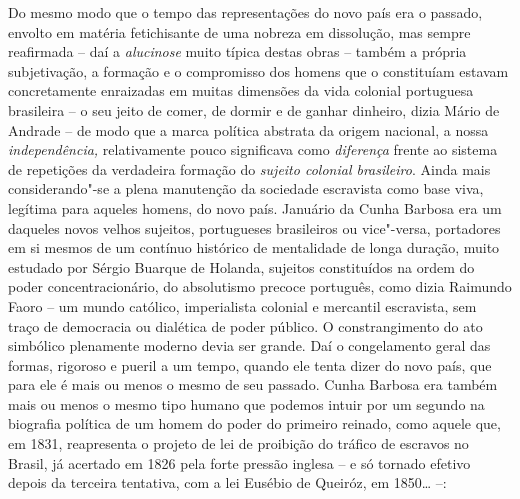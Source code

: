 Do mesmo modo que o tempo das representações do novo país era o passado,
envolto em matéria fetichisante de uma nobreza em dissolução, mas sempre
reafirmada -- daí a \emph{alucinose} muito típica destas obras -- também
a própria subjetivação, a formação e o compromisso dos homens que o
constituíam estavam concretamente enraizadas em muitas dimensões da vida
colonial portuguesa brasileira -- o seu jeito de comer, de dormir e de
ganhar dinheiro, dizia Mário de Andrade -- de modo que a marca política
abstrata da origem nacional, a nossa \emph{independência,} relativamente
pouco significava como \emph{diferença} frente ao sistema de repetições
da verdadeira formação do \emph{sujeito colonial brasileiro}. Ainda mais
considerando"-se a plena manutenção da sociedade escravista como base
viva, legítima para aqueles homens, do novo país. Januário da Cunha
Barbosa era um daqueles novos velhos sujeitos, portugueses brasileiros
ou vice"-versa, portadores em si mesmos de um contínuo histórico de
mentalidade de longa duração, muito estudado por Sérgio Buarque de
Holanda, sujeitos constituídos na ordem do poder concentracionário, do
absolutismo precoce português, como dizia Raimundo Faoro -- um mundo
católico, imperialista colonial e mercantil escravista, sem traço de
democracia ou dialética de poder público. O constrangimento do ato
simbólico plenamente moderno devia ser grande. Daí o congelamento geral
das formas, rigoroso e pueril a um tempo, quando ele tenta dizer do novo
país, que para ele é mais ou menos o mesmo de seu passado. Cunha Barbosa
era também mais ou menos o mesmo tipo humano que podemos intuir por um
segundo na biografia política de um homem do poder do primeiro reinado,
como aquele que, em 1831, reapresenta o projeto de lei de proibição do
tráfico de escravos no Brasil, já acertado em 1826 pela forte pressão
inglesa -- e só tornado efetivo depois da terceira tentativa, com a lei
Eusébio de Queiróz, em 1850\ldots{} --:

